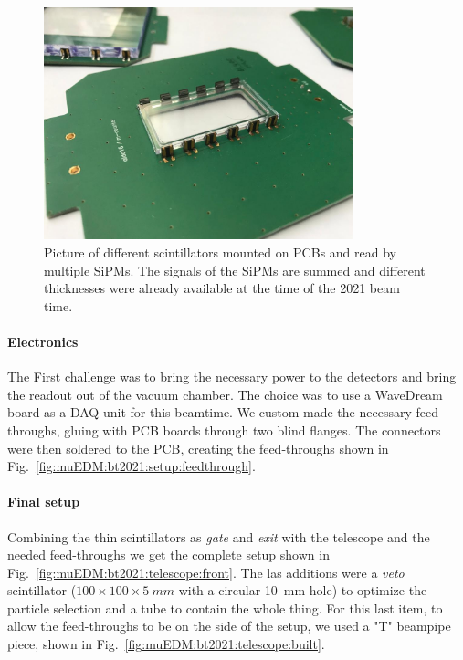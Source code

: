 \begin{refsection}
        \begin{figure}
            \centering
            \includegraphics[width = 0.8\textwidth]{Figures/muEDM/thin_scintillators.jpg}
            \caption[muEDM: Thin scintillators for the beamtimes.]{Picture of different scintillators mounted on PCBs and read by multiple SiPMs. The signals of the SiPMs are summed and different thicknesses were already available at the time of the 2021 beam time.}
            \label{fig:muEDM:thin_scintillators}
        \end{figure}

        \paragraph{Electronics}
        The First challenge was to bring the necessary power to the detectors and bring the readout out of the vacuum chamber.
        The choice was to use a WaveDream board as a DAQ unit for this beamtime.
        We custom-made the necessary feed-throughs, gluing with \stycast PCB boards through two blind flanges.
        The connectors were then soldered to the PCB, creating the feed-throughs shown in Fig.~\ref{fig:muEDM:bt2021:setup:feedthrough}.
        
        \paragraph{Final setup}
        Combining the thin scintillators as \textit{gate} and \textit{exit} with the telescope and the needed feed-throughs we get the complete setup shown in Fig.~\ref{fig:muEDM:bt2021:telescope:front}.
        The las additions were a \textit{veto} scintillator ($100\times 100\times\SI{5}{mm}$ with a circular \SI{10}{mm} hole) to optimize the particle selection and a tube to contain the whole thing.
        For this last item, to allow the feed-throughs to be on the side of the setup, we used a "T" beampipe piece, shown in Fig.~\ref{fig:muEDM:bt2021:telescope:built}.
        

\end{refsection}
